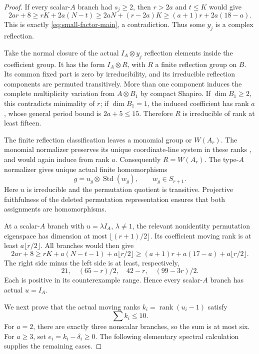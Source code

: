 \documentclass[11pt]{article}
\theoremstyle{definition}
\theoremstyle{remark}
\begin{document}
\begin{proof}
If every scalar-$A$ branch had $s_j\geq2$, then $r>2a$
and $t\leq K$ would give
\[
 2ar+8\geq rK+2a(N-t)
       \geq2aN+(r-2a)K
       \geq(a+1)r+2a(18-a).
\]
This is exactly \eqref{eq:small-factor-main}, a contradiction.
Thus some $y_j$ is a complex reflection.

Take the normal closure of the actual $I_A\otimes y_j$
reflection elements inside the coefficient group.
It has the form $I_A\otimes R$, with $R$ a finite reflection
group on $B$.  Its common fixed part is zero by irreducibility,
and its irreducible reflection components are permuted
transitively.  More than one component induces the complete
multiplicity variation from $A\otimes B_1$ by compact Shapiro.
If $\dim B_1\geq2$, this contradicts minimality of $r$;
if $\dim B_1=1$, the induced coefficient has rank $a$,
whose general period bound is $2a+5\leq15$.
Therefore $R$ is irreducible of rank at least fifteen.

The finite reflection classification leaves a monomial group
or $W(A_r)$.  The monomial normalizer preserves its unique
coordinate-line system in these ranks
\cite[Lemma~(2.7)]{CohenReflection}, and would again induce
from rank $a$.  Consequently $R=W(A_r)$.
The type-$A$ normalizer gives unique actual finite
homomorphisms
\[
 g=u_g\otimes\operatorname{Std}(w_g),\qquad w_g\in S_{r+1}.
\]
Here $u$ is irreducible and the permutation quotient is
transitive.  Projective faithfulness of the deleted permutation
representation ensures that both assignments are homomorphisms.

At a scalar-$A$ branch with $u=\lambda I_A$, $\lambda\ne1$,
the relevant nonidentity permutation eigenspace has dimension
at most $\lfloor(r+1)/2\rfloor$.
Its coefficient moving rank is at least $a\lfloor r/2\rfloor$.
All branches would then give
\[
 2ar+8\geq rK+a(N-t-1)+a\lfloor r/2\rfloor
       \geq(a+1)r+a(17-a)+a\lfloor r/2\rfloor.
\]
The right side minus the left side is at least, respectively,
\[
                  21,\quad(65-r)/2,\quad42-r,
                  \quad(99-3r)/2.
\]
Each is positive in its counterexample range.
Hence every scalar-$A$ branch has actual $u=I_A$.

We next prove that the actual moving ranks
$k_i=\operatorname{rank}(u_i-1)$ satisfy
\begin{equation}\label{eq:small-factor-actual-ranks}
                              \sum k_i\leq10.
\end{equation}
For $a=2$, there are exactly three nonscalar branches, so
the sum is at most six.
For $a\geq3$, set $e_i=k_i-\delta_i\geq0$.
The following elementary spectral calculation supplies the
remaining cases.


\end{proof}
\end{document}
